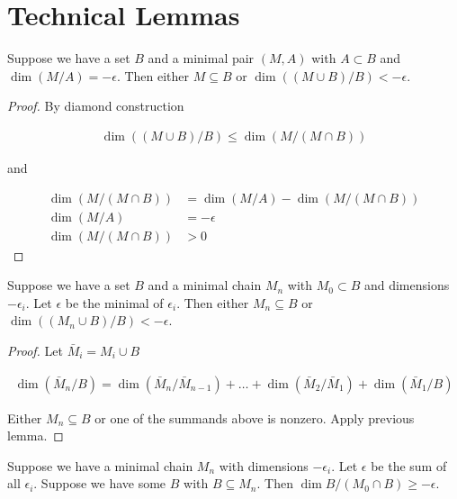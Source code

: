 \documentclass{amsart}
\begin{document}
\section{Technical Lemmas}

\begin{Lemma}
	Suppose we have a set $B$ and a minimal pair $(M, A)$ with $A \subset B$ and $\dim(M/A) = -\epsilon$.
Then either $M \subseteq B$ or $\dim((M \cup B)/B) < -\epsilon$.
\end{Lemma}

\begin{proof}
	By diamond construction

	\begin{align*}
		\dim((M \cup B)/B) \leq \dim(M / (M \cap B))
	\end{align*}

	and 

	\begin{align*}
		\dim(M / (M \cap B)) &= \dim (M/A) - \dim(M / (M \cap B)) \\
		\dim (M/A) &= -\epsilon \\
		\dim(M / (M \cap B)) &> 0
	\end{align*}
\end{proof}



\begin{Lemma}	\label{chain_lemma}
	Suppose we have a set $B$ and a minimal chain $M_n$ with $M_0 \subset B$ and dimensions $-\epsilon_i$.
Let $\epsilon$ be the minimal of $\epsilon_i$.
Then either $M_n \subseteq B$ or $\dim((M_n \cup B)/B) < -\epsilon$.
\end{Lemma}


\begin{proof}
	Let $\bar M_i = M_i \cup B$

	\begin{align*}
		\dim(\bar M_n/B) = \dim(\bar M_n/\bar M_{n-1}) + \ldots + \dim(\bar M_2/\bar M_1) + \dim(\bar M_1/B)
	\end{align*}

	Either $M_n \subseteq B$ or one of the summands above is nonzero.
	Apply previous lemma.
\end{proof}

\begin{Lemma} \label{chain_intersect}
	Suppose we have a minimal chain $M_n$ with dimensions $-\epsilon_i$.
	Let $\epsilon$ be the sum of all $\epsilon_i$.
	Suppose we have some $B$ with $B \subseteq M_n$.
	Then $\dim B / (M_0 \cap B) \geq -\epsilon$.
\end{Lemma}
\end{document}
